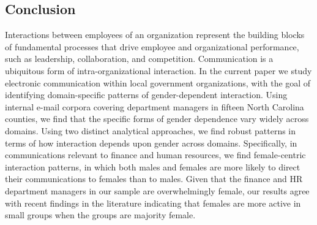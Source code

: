 \documentclass{pnastwo}
\begin{document}
\begin{article}
\section{Conclusion}

Interactions between employees of an organization represent the building blocks of fundamental processes that drive employee and organizational performance, such as leadership, collaboration, and competition. Communication is a ubiquitous form of intra-organizational interaction. In the current paper we study electronic communication within local government organizations, with the goal of identifying domain-specific patterns of gender-dependent interaction. Using internal e-mail corpora covering department managers in fifteen North Carolina counties, we find that the specific forms of gender dependence vary widely across domains. Using two distinct analytical approaches, we find robust patterns in terms of how interaction depends upon gender across domains. Specifically, in communications relevant to finance and human resources, we find female-centric interaction patterns, in which both males and females are more likely to direct their communications to females than to males. Given that the finance and HR department managers in our sample are overwhelmingly female, our results agree with recent findings in the literature indicating that females are more active in small groups when the groups are majority female. 



\end{article}
\end{document}
